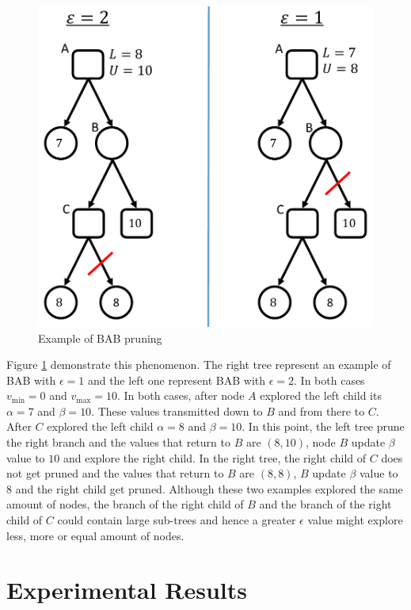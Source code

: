 \documentclass[letterpaper]{article} %
\newcommand{\vmax}{v_{\text{max}}}
\newcommand{\vmin}{v_{\text{min}}}
\begin{document}
\begin{figure}
	\centering
	\includegraphics[width=0.8\columnwidth]{Figures/cropped_example_different_e.pdf}
	\caption{Example of BAB pruning}
	\label{fig:bab-prune}
\end{figure}

Figure \ref{fig:bab-prune} demonstrate this phenomenon. The right tree represent an example of BAB with $\epsilon = 1$ and the left one represent BAB with $\epsilon = 2$. In both cases $\vmin = 0$ and $\vmax = 10$. In both cases, after node $A$ explored the left child its $\alpha = 7$ and $\beta = 10$. These values transmitted down to $B$ and from there to $C$. After $C$ explored the left child $\alpha = 8$ and $\beta = 10$. In this point, the left tree prune the right branch and the values that return to $B$ are $(8,10)$, node $B$ update $\beta$ value to $10$ and explore the right child. In the right tree, the right child of $C$ does not get pruned and the values that return to $B$ are $(8,8)$, $B$ update $\beta$ value to $8$ and the right child get pruned. Although these two examples explored the same amount of nodes, the branch of the right child of $B$ and the branch of the right child of $C$ could contain large sub-trees and hence a greater $\epsilon$ value might explore less, more or equal amount of nodes. 





\section{Experimental Results}
\end{document}

